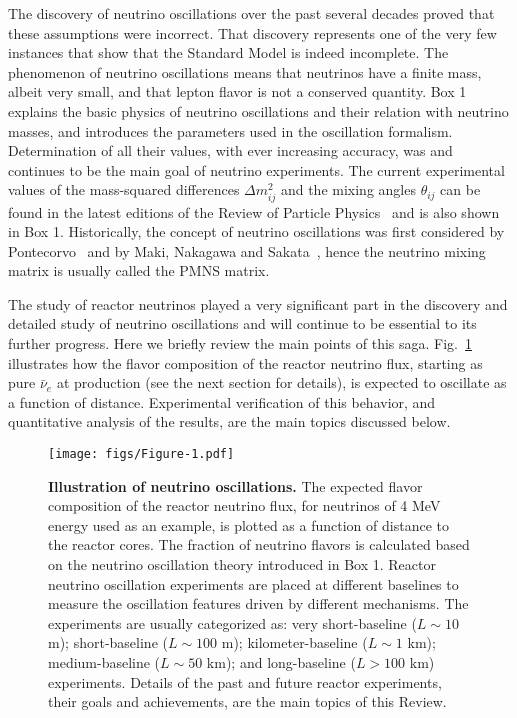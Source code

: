 \documentclass[aps,twocolumn,preprintnumbers,amsmath,superscriptaddress,amssymb,floats,nofootinbib]{revtex4-1}
\begin{document}
The discovery of neutrino oscillations over the past several decades
proved that these assumptions were incorrect. That discovery
represents one of the very few instances that show that 
the Standard Model is indeed incomplete. 
The phenomenon of neutrino oscillations means that
neutrinos have a finite mass, albeit very small, and that lepton flavor is not a conserved quantity.
Box 1 explains the basic physics of neutrino oscillations and their relation with neutrino masses, and introduces the parameters used in the oscillation formalism. Determination of all their values,
with ever increasing accuracy,
was and continues to be the main goal of neutrino experiments.
The current experimental values of the mass-squared differences $\Delta m^2_{ij}$ and the mixing angles $\theta_{ij}$ can be found
in the latest editions of the Review of Particle Physics~\cite{PDG14} and is also shown in Box 1.
Historically, the concept of neutrino oscillations was first considered by Pontecorvo~\cite{Pontecorvo57, Pontecorvo58}
and by Maki, Nakagawa and Sakata~\cite{MNS62}, hence the neutrino mixing matrix is usually called the PMNS matrix.

The study of reactor neutrinos played a very significant part in the discovery and detailed study of neutrino oscillations and will continue 
to be essential to its further progress. Here we briefly review
the main points of this saga. Fig.~\ref{fig:intro1} illustrates how the flavor composition of the reactor neutrino flux, starting as pure $\bar\nu_e$ at production (see the next section for details), is expected to oscillate as a function of distance.
Experimental verification of this behavior, and quantitative analysis of the results, are the main topics discussed below.

\begin{figure}[tb]
\begin{centering}
\texttt{[image: figs/Figure-1.pdf]}
\par\end{centering}
\caption{\label{fig:intro1} {\bf Illustration of neutrino oscillations.} The expected flavor composition of the reactor neutrino flux, for neutrinos of 4 MeV energy
used as an example, is plotted as a function of distance to the reactor cores. The fraction of neutrino flavors is calculated based on the neutrino oscillation theory introduced in Box 1. Reactor neutrino oscillation experiments are placed at different baselines to measure the oscillation features driven by different mechanisms. The experiments are usually categorized as: very short-baseline ($L\sim10$ m); short-baseline ($L\sim100$ m); kilometer-baseline ($L\sim1$ km); medium-baseline ($L\sim50$ km); and long-baseline ($L>100$ km) experiments. Details of the past and future reactor experiments, their goals and achievements, are the main topics of this Review.
}
\end{figure}
\end{document}
